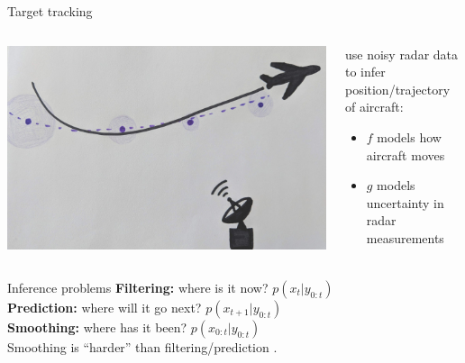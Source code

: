 \documentclass[aspectratio=169]{beamer}
\theoremstyle{definition}
\begin{document}
\begin{frame}{Target tracking}
\begin{columns}
\begin{column}{0.6\textwidth}
\includegraphics[width=\textwidth]{../tracking.jpg}
\end{column}
\begin{column}{0.35\textwidth}
use noisy radar data to infer position/trajectory of aircraft:
\begin{itemize}
\item $f$ models how aircraft moves
\item $g$ models uncertainty in radar measurements
\end{itemize}
\end{column}
\end{columns}
\end{frame}

\begin{frame}{Inference problems}
\textbf{Filtering:} where is it now? $p(x_{t} | y_{0:t})$\\[7pt]
\textbf{Prediction:} where will it go next? $p(x_{t+1} | y_{0:t})$\\[7pt]
\textbf{Smoothing:} where has it been? $p(x_{0:t} | y_{0:t})$\\[12pt]

Smoothing is ``harder'' than filtering/prediction \cite{gordon1993}. 
\end{frame}
\end{document}
